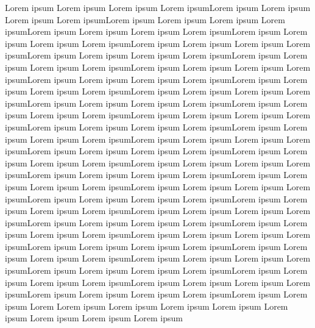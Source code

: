Lorem ipsum Lorem ipsum Lorem ipsum Lorem ipsumLorem ipsum Lorem ipsum Lorem ipsum Lorem ipsumLorem ipsum Lorem ipsum Lorem ipsum Lorem ipsumLorem ipsum Lorem ipsum Lorem ipsum Lorem ipsumLorem ipsum Lorem ipsum Lorem ipsum Lorem ipsumLorem ipsum Lorem ipsum Lorem ipsum Lorem ipsumLorem ipsum Lorem ipsum Lorem ipsum Lorem ipsumLorem ipsum Lorem ipsum Lorem ipsum Lorem ipsumLorem ipsum Lorem ipsum Lorem ipsum Lorem ipsumLorem ipsum Lorem ipsum Lorem ipsum Lorem ipsumLorem ipsum Lorem ipsum Lorem ipsum Lorem ipsumLorem ipsum Lorem ipsum Lorem ipsum Lorem ipsumLorem ipsum Lorem ipsum Lorem ipsum Lorem ipsumLorem ipsum Lorem ipsum Lorem ipsum Lorem ipsumLorem ipsum Lorem ipsum Lorem ipsum Lorem ipsumLorem ipsum Lorem ipsum Lorem ipsum Lorem ipsumLorem ipsum Lorem ipsum Lorem ipsum Lorem ipsumLorem ipsum Lorem ipsum Lorem ipsum Lorem ipsumLorem ipsum Lorem ipsum Lorem ipsum Lorem ipsumLorem ipsum Lorem ipsum Lorem ipsum Lorem ipsumLorem ipsum Lorem ipsum Lorem ipsum Lorem ipsumLorem ipsum Lorem ipsum Lorem ipsum Lorem ipsumLorem ipsum Lorem ipsum Lorem ipsum Lorem ipsumLorem ipsum Lorem ipsum Lorem ipsum Lorem ipsumLorem ipsum Lorem ipsum Lorem ipsum Lorem ipsumLorem ipsum Lorem ipsum Lorem ipsum Lorem ipsumLorem ipsum Lorem ipsum Lorem ipsum Lorem ipsumLorem ipsum Lorem ipsum Lorem ipsum Lorem ipsumLorem ipsum Lorem ipsum Lorem ipsum Lorem ipsumLorem ipsum Lorem ipsum Lorem ipsum Lorem ipsumLorem ipsum Lorem ipsum Lorem ipsum Lorem ipsumLorem ipsum Lorem ipsum Lorem ipsum Lorem ipsumLorem ipsum Lorem ipsum Lorem ipsum Lorem ipsumLorem ipsum Lorem ipsum Lorem ipsum Lorem ipsumLorem ipsum Lorem ipsum Lorem ipsum Lorem ipsumLorem ipsum Lorem ipsum Lorem ipsum Lorem ipsumLorem ipsum Lorem ipsum Lorem ipsum Lorem ipsumLorem ipsum Lorem ipsum Lorem
Lorem ipsum Lorem ipsum Lorem ipsum Lorem ipsum
Lorem ipsum Lorem ipsum Lorem ipsum Lorem ipsum
